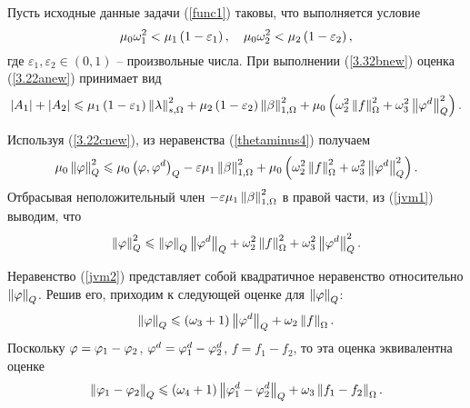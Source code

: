 Пусть исходные данные задачи (\ref{func1}) таковы, что выполняется условие
\begin{equation}
	\label{3.32bnew} 
	\mu_0 \omega_1^2 < \mu_1 \left( 1 - \varepsilon_1 \right), \quad 
	\mu_0 \omega_2^2 < \mu_2 \left( 1 - \varepsilon_2 \right),
\end{equation}
где $\varepsilon_1, \varepsilon_2 \in (0, 1)$ -- произвольные 
числа. При выполнении (\ref{3.32bnew}) оценка (\ref{3.22anew}) принимает вид
\begin{equation}
	\label{3.22cnew} 
	\begin{split}
		\left\vert A_1 \right\vert + \left\vert A_2 \right\vert 
		\leqslant 
			\mu_1 
			\left( 1 - \varepsilon_1 \right) 
			\left\Vert \lambda \right\Vert_{s,\Omega}^2 
			+ \mu_2 
			\left( 1 - \varepsilon_2 \right) 
			\left\Vert \beta \right\Vert_{1,\Omega}^2 
			+ \mu_0 
			\left( 
				\omega_2^2 
				\left\Vert f \right\Vert_\Omega^2 
				+ \omega_3^2 
				\left\Vert \varphi^d \right\Vert_Q^2
			 \right).
	\end{split}
\end{equation}

Используя (\ref{3.22cnew}), из неравенства (\ref{thetaminus4}) получаем
\begin{equation}
	\label{jvm1}
	\mu_0 \left\Vert \varphi \right\Vert_Q^2 
	\leqslant 
		\mu_0 \left( \varphi, \varphi^d \right)_Q 
		- \varepsilon \mu_1 
		\left\Vert \beta \right\Vert_{1,\Omega}^2 
		+ \mu_0 
		\left( 
			\omega_2^2 \left\Vert f \right\Vert_\Omega^2 
			+ \omega_3^2 \left\Vert \varphi^d \right\Vert_Q^2
		 \right).
\end{equation}
Отбрасывая неположительный член $- \varepsilon \mu_1 \left\Vert \beta \right\Vert_{1,\Omega}^2$ в правой части, из (\ref{jvm1}) выводим, что
\begin{equation}
	\label{jvm2}
	\left\Vert \varphi \right\Vert_Q^2 
	\leqslant 
		\left\Vert \varphi \right\Vert_Q 
		\left\Vert \varphi^d \right\Vert_Q 
		+ \omega_2^2 
		\left\Vert f \right\Vert_\Omega^2 
		+ \omega_3^2 
		\left\Vert \varphi^d \right\Vert_Q^2.
\end{equation}

Неравенство (\ref{jvm2}) представляет собой квадратичное неравенство относительно $\left\Vert \varphi \right\Vert_Q$. Решив его, приходим к следующей оценке  для $\left\Vert \varphi \right\Vert_Q$: 
\[
	\left\Vert \varphi \right\Vert_Q 
	\leqslant 
		\left( \omega_3 + 1 \right) 
		\left\Vert \varphi^d \right\Vert_Q 
		+ \omega_2 
		\left\Vert f \right\Vert_\Omega.
\] 
Поскольку $\varphi = \varphi_1 - \varphi_2$, $\varphi^d = \varphi^d_1 - \varphi^d_2$, $f = f_1 - f_2$, то эта оценка эквивалентна оценке 
\begin{equation}
	\label{jvm4}
	\left\Vert \varphi_1 - \varphi_2 \right\Vert_Q 
	\leqslant 
		\left( \omega_4 + 1 \right) 
		\left\Vert \varphi^d_1 - \varphi^d_2 \right\Vert_Q 
		+ \omega_3 
		\left\Vert f_1 - f_2 \right\Vert_\Omega.
\end{equation}

